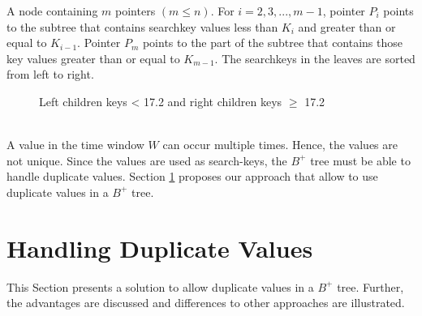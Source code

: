 \documentclass[abstracton,12pt]{scrreprt}
\begin{document}
A node containing $m$ pointers $\left(m \leq n\right)$. For $i = 2, 3, . . . ,m-1$, pointer $P_i$ points to the subtree that contains searchkey values less than $K_i$ and greater than or equal to $K_{i-1}$. Pointer $P_m$ points to the part of the subtree that contains those key values greater than or equal to $K_{m-1}$. The searchkeys in the leaves are sorted from left to right. 
\begin{figure}[ht!]
	\centering
	\vspace{2mm}
	\caption{Left children keys < 17.2 and right children keys $\geq$ 17.2}
	\label{fig:BTreeBook}
\end{figure} 
\\A value in the time window $W$ can occur multiple times. Hence, the values are not unique. Since the values are used as search-keys, the $B^+$ tree must be able to handle duplicate values. Section \ref{sec:allowDV} proposes our approach that allow to use duplicate values in a $B^+$ tree. 

\section{Handling Duplicate Values}
\label{sec:allowDV}
This Section presents a solution to allow duplicate values in a $B^+$ tree. Further, the advantages are discussed and  differences to other approaches are illustrated. 
\end{document}
